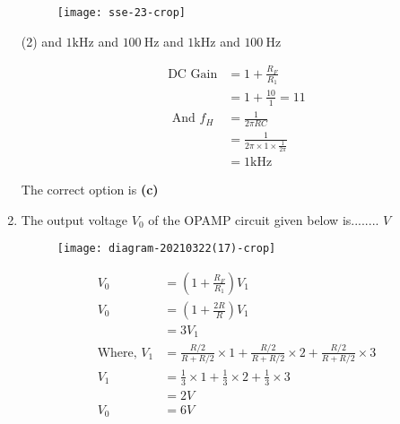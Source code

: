 \begin{enumerate}
\begin{figure}[H]
	\centering
	\texttt{[image: sse-23-crop]}

\end{figure}

\begin{tasks}(2)
 and $1 \mathrm{kHz}$
 and $100 \mathrm{~Hz}$
 and $1 \mathrm{kHz}$
 and $100 \mathrm{~Hz}$
\end{tasks}
\begin{answer}
	\begin{align*}
	\text{DC Gain}&=1+\frac{R_{F}}{R_{1}}\\&=1+\frac{10}{1}=11 \\ \text { And } f_{H}&=\frac{1}{2 \pi R C}\\&=\frac{1}{2 \pi \times 1 \times \frac{1}{2 \pi}}\\&=1 \mathrm{kHz}	
	\end{align*}

The correct option is \textbf{(c)}
\end{answer}
	\item The output voltage $V_{0}$ of the OPAMP circuit given below is........ $V$

\begin{figure}[H]
	\centering
	\texttt{[image: diagram-20210322(17)-crop]}

\end{figure}

\begin{answer}
	\begin{align*}
	V_{0}&=\left(1+\frac{R_{F}}{R_{1}}\right) V_{1}\\
	V_{0}&=\left(1+\frac{2 R}{R}\right) V_{1}\\&=3 V_{1}\\
	\text{Where, } V_{1}&=\frac{R / 2}{R+R / 2} \times 1+\frac{R / 2}{R+R / 2} \times 2+\frac{R / 2}{R+R / 2} \times 3\\
	V_{1}&=\frac{1}{3} \times 1+\frac{1}{3} \times 2+\frac{1}{3} \times 3\\&=2 V \\
	 V_{0}&=6 V
	\end{align*}


\end{answer}
\end{enumerate}
